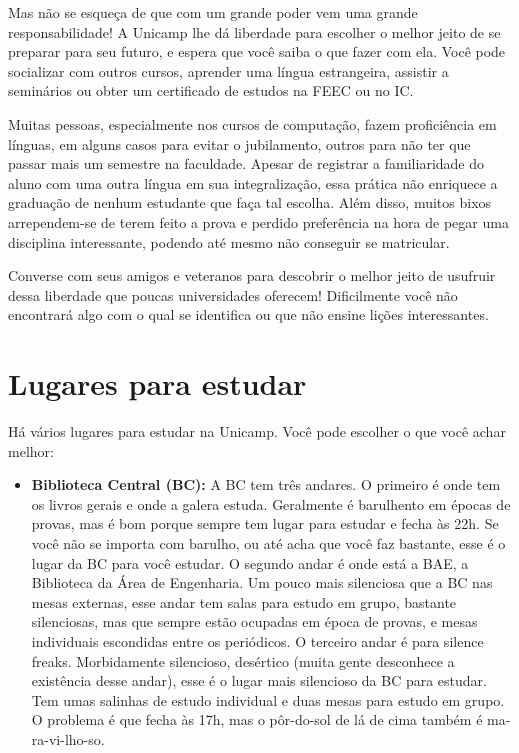 Mas não se esqueça de que com um grande poder vem uma grande responsabilidade!
A Unicamp lhe dá liberdade para escolher o melhor jeito de se preparar para seu
futuro, e espera que você saiba o que fazer com ela. Você pode socializar com
outros cursos, aprender uma língua estrangeira, assistir a seminários ou obter
um certificado de estudos na FEEC ou no IC.

Muitas pessoas, especialmente nos cursos de computação, fazem proficiência em
línguas, em alguns casos para evitar o jubilamento, outros para não ter que
passar mais um semestre na faculdade. Apesar de registrar a familiaridade do
aluno com uma outra língua em sua integralização, essa prática não enriquece
a graduação de nenhum estudante que faça tal escolha. Além disso, muitos bixos
arrependem-se de terem feito a prova e perdido preferência na hora de pegar uma
disciplina interessante, podendo até mesmo não conseguir se matricular.

Converse com seus amigos e veteranos para descobrir o melhor jeito de usufruir
dessa liberdade que poucas universidades oferecem! Dificilmente você não
encontrará algo com o qual se identifica ou que não ensine lições interessantes.

\newpage
\section{Lugares para estudar}

Há vários lugares para estudar na Unicamp. Você pode escolher o que você achar
melhor:

\begin{itemize}
\item  \textbf{Biblioteca Central (BC):} A BC tem três andares. O primeiro é onde tem os livros gerais e onde a galera estuda. Geralmente é barulhento em épocas de provas, mas é bom porque sempre tem lugar para estudar e fecha às 22h. Se você não se importa com barulho, ou até acha que você faz bastante, esse é o lugar da BC para você estudar. O segundo andar é onde está a BAE, a Biblioteca da Área de Engenharia. Um pouco mais silenciosa que a BC nas mesas externas, esse andar tem salas para estudo em grupo, bastante silenciosas, mas que sempre estão ocupadas em época de provas, e mesas individuais escondidas entre os periódicos. O terceiro andar é para silence freaks. Morbidamente silencioso, desértico (muita gente desconhece a existência desse andar), esse é o lugar mais silencioso da BC para estudar. Tem umas salinhas de estudo individual e duas mesas para estudo em grupo. O problema é que fecha às 17h, mas o pôr-do-sol de lá de cima também é ma-ra-vi-lho-so.
\end{itemize}

